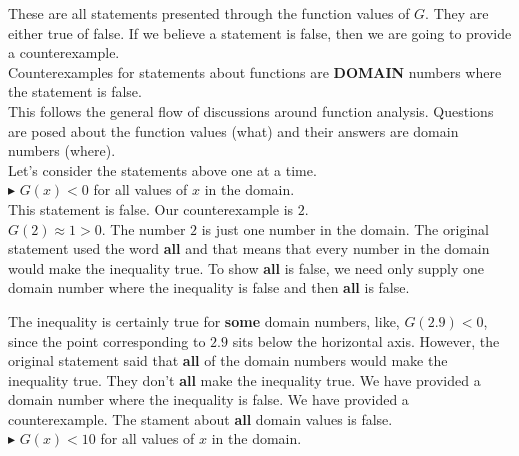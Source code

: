 \documentclass{ximera}
\begin{document}
These are all statements presented through the function values of $G$.  They are either true of false.  If we believe a statement is false, then we are going to provide a counterexample. \\

Counterexamples for statements about functions are \textbf{\textcolor{red!80!black}{DOMAIN}} numbers where the statement is false. \\


This follows the general flow of discussions around function analysis.  Questions are posed about the function values (what) and their answers are domain numbers (where). \\


Let's consider the statements above one at a time. \\












\textbf{\textcolor{red!90!darkgray}{$\blacktriangleright$}} $G(x) < 0$  for all values of $x$ in the domain. \\


This statement is false. Our counterexample is $2$.  \\

$G(2) \approx 1 > 0$. The number $2$ is just one number in the domain.   The original statement used the word \textbf{all} and that means that every number in the domain would make the inequality true.  To show \textbf{all} is false, we need only supply one domain number where the inequality is false and then \textbf{all} is false.

The inequality is certainly true for \textbf{some} domain numbers, like, $G(2.9) < 0$, since the point corresponding to $2.9$ sits below the horizontal axis.  However, the original statement said that \textbf{all} of the domain numbers would make the inequality true. They don't \textbf{all} make the inequality true.  We have provided a domain number where the inequality is false. We have provided a counterexample. The stament about \textbf{all} domain values is false.\\









\textbf{\textcolor{red!90!darkgray}{$\blacktriangleright$}} $G(x) < 10$  for all values of $x$ in the domain. \\
\end{document}

